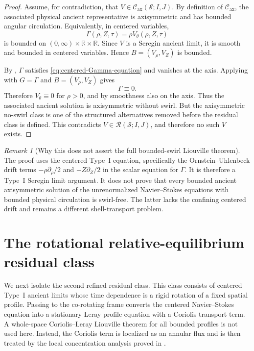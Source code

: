 \documentclass[11pt]{amsart}
\numberwithin{equation}{section}
\theoremstyle{plain}
\theoremstyle{definition}
\theoremstyle{remark}
\newtheorem{remark}[remark]{Remark}
\newcommand{\Cax}{\mathcal C_{\mathrm{ax}}}
\begin{document}
\begin{proof}
Assume, for contradiction, that
\(V\in\Cax(\mathcal S;I,J)\).  By definition of \(\Cax\), the
associated physical ancient representative is axisymmetric and has bounded
angular circulation.  Equivalently, in centered variables,
\[
   \Gamma(\rho,Z,\tau)=\rho V_\theta(\rho,Z,\tau)
\]
is bounded on \((0,\infty)\times\mathbb R\times\mathbb R\).  Since \(V\) is a
Seregin ancient limit, it is smooth and bounded in centered variables.  Hence
\(B=(V_\rho,V_Z)\) is bounded.

By , \(\Gamma\) satisfies
\eqref{eq:centered-Gamma-equation} and vanishes at the axis.  Applying
 with \(G=\Gamma\) and
\(B=(V_\rho,V_Z)\) gives
\[
   \Gamma\equiv0 .
\]
Therefore \(V_\theta\equiv0\) for \(\rho>0\), and by smoothness also on the
axis.  Thus the associated ancient solution is axisymmetric without swirl.
But the axisymmetric no-swirl class is one of the structured alternatives
removed before the residual class is defined.  This contradicts
\(V\in\mathcal R(\mathcal S;I,J)\), and therefore no such \(V\) exists.
\end{proof}

\begin{remark}[Why this does not assert the full bounded-swirl Liouville theorem]
The proof uses the centered Type~I equation, specifically the
Ornstein--Uhlenbeck drift terms \(-\rho\partial_\rho/2\) and
\(-Z\partial_Z/2\) in the scalar equation for \(\Gamma\).  It is therefore a
Type~I Seregin limit argument.  It does not prove that every bounded ancient
axisymmetric solution of the unrenormalized Navier--Stokes equations with
bounded physical circulation is swirl-free.  The latter lacks the confining
centered drift and remains a different shell-transport problem.
\end{remark}


\section{The rotational relative-equilibrium residual class}
\label{sec:R2-reduction}

We next isolate the second refined residual class.  This class consists of
centered Type~I ancient limits whose time dependence is a rigid rotation of a
fixed spatial profile.  Passing to the co-rotating frame converts the centered
Navier--Stokes equation into a stationary Leray profile equation with a
Coriolis transport term.  A whole-space Coriolis--Leray Liouville theorem for
all bounded profiles is not used here.  Instead, the Coriolis term is localized as an annular
flux and is then treated by the local concentration analysis proved in
.
\end{document}
